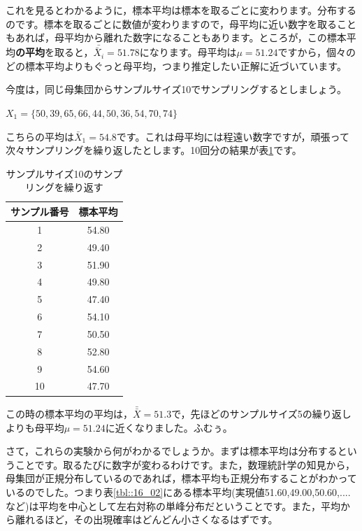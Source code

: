 \documentclass{ltjsbook}
\begin{document}
これを見るとわかるように，標本平均は標本を取るごとに変わります。分布するのです。標本を取るごとに数値が変わりますので，母平均に近い数字を取ることもあれば，母平均から離れた数字になることもあります。ところが，この標本平均{\bf の平均}を取ると，$\bar{\bar{X}_i}=51.78$になります。母平均は$\mu=51.24$ですから，個々のどの標本平均よりもぐっと母平均，つまり推定したい正解に近づいています。

今度は，同じ母集団からサンプルサイズ10でサンプリングするとしましょう。
\begin{tcolorbox}
  $ X_1=\{50, 39, 65, 66, 44, 50, 36, 54, 70, 74\}$
\end{tcolorbox}
こちらの平均は$\bar{X}_1=54.8$です。これは母平均には程遠い数字ですが，頑張って次々サンプリングを繰り返したとします。10回分の結果が表\ref{tbl::16_03}です。

\begin{table}[ht]
    \centering
    \caption{サンプルサイズ10のサンプリングを繰り返す}
    \begin{tabular}{cc}
      \hline
    サンプル番号 & 標本平均 \\ 
      \hline
      1 & 54.80 \\ 
      2 & 49.40 \\ 
      3 & 51.90 \\ 
      4 & 49.80 \\ 
      5 & 47.40 \\ 
      6 & 54.10 \\ 
      7 & 50.50 \\ 
      8 & 52.80 \\ 
      9 & 54.60 \\ 
      10 & 47.70 \\ 
       \hline
    \end{tabular}
    \label{tbl::16_03}
    \end{table}

この時の標本平均の平均は，$\bar{\bar{X}}=51.3$で，先ほどのサンプルサイズ5の繰り返しよりも母平均$\mu=51.24$に近くなりました。ふむぅ。

さて，これらの実験から何がわかるでしょうか。まずは標本平均は分布するということです。取るたびに数字が変わるわけです。また，数理統計学の知見から，母集団が正規分布しているのであれば，標本平均も正規分布することがわかっているのでした。つまり表\ref{tbl::16_02}にある標本平均(実現値51.60,49.00,50.60,....など)は平均を中心として左右対称の単峰分布だということです。また，平均から離れるほど，その出現確率はどんどん小さくなるはずです。
\end{document}
